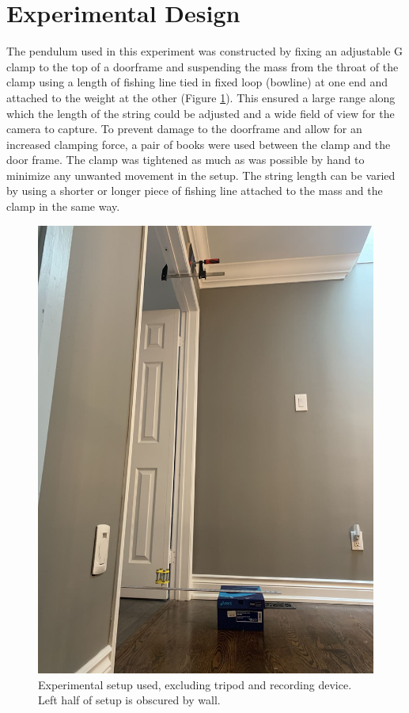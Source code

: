 \documentclass[11pt]{article}
\begin{document}

    \section{Experimental Design}\label{sec:design}
        The pendulum used in this experiment was constructed by fixing an adjustable G clamp to the top of a doorframe and suspending the mass from the throat of the clamp using a length of fishing line tied in fixed loop (bowline) at one end and attached to the weight at the other (Figure \ref{fig:setup}). This ensured a large range along which the length of the string could be adjusted and a wide field of view for the camera to capture. To prevent damage to the doorframe and allow for an increased clamping force, a pair of books were used between the clamp and the door frame. The clamp was tightened as much as was possible by hand to minimize any unwanted movement in the setup. The string length can be varied by using a shorter or longer piece of fishing line attached to the mass and the clamp in the same way. 

        \begin{figure}[H]
            \centering\includegraphics[width=.7\linewidth]{setup.jpg}
            \caption{Experimental setup used, excluding tripod and recording device. Left half of setup is obscured by wall.}
            \label{fig:setup}
        \end{figure}
        
\end{document}

